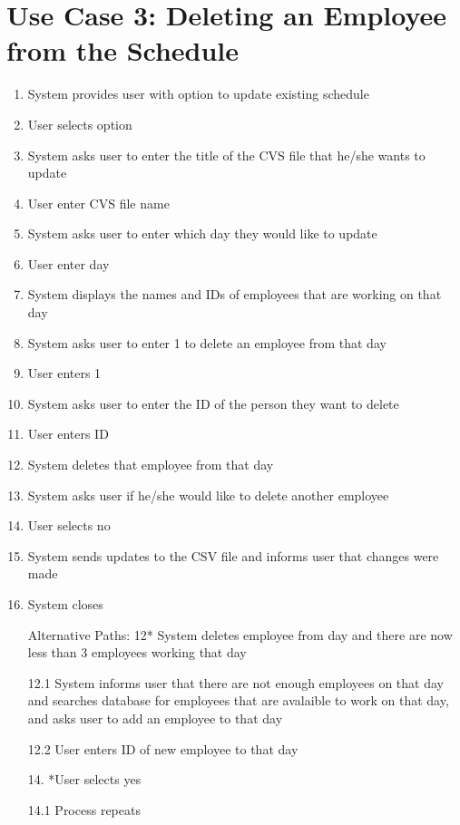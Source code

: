 \documentclass[12pt]{article}
\begin{document}
\section*{ Use Case 3: Deleting an Employee from the Schedule}

\begin{enumerate}

 \item
System provides user with option to update existing schedule

\item
User selects option

\item
System asks user to enter the title of the CVS file that he/she wants to update

\item
User enter CVS file name

\item
System asks user to enter which day they would like to update

\item
User enter day

\item
System displays the names and IDs of employees that are working on that day

\item
System asks user to enter 1 to delete an employee from that day

\item
User enters 1

\item
System asks user to enter the ID of the person they want to delete

\item
User enters ID

\item
System deletes that employee from that day

\item
System asks user if he/she would like to delete another employee

\item
User selects no

\item
System sends updates to the CSV file and informs user that changes were made

\item
System closes

Alternative Paths:
12* System deletes employee from day and there are now less than 3 employees working that day

12.1 System informs user that there are not enough employees on that day and searches database for employees that are avalaible to work on that day, and asks user to add an employee to that day

12.2 User enters ID of new employee to that day

14. *User selects yes

14.1 Process repeats


\end{enumerate}
\end{document}
